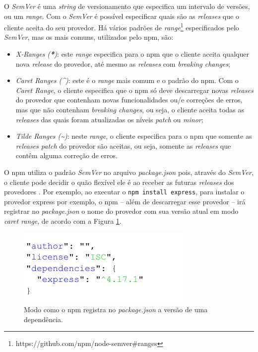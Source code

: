 O \textit{SemVer} é uma \textit{string} de versionamento que especifica um intervalo de versões, ou um \textit{range}. Com o \textit{SemVer} é possível especificar quais são as \textit{releases} que o cliente aceita do seu provedor. Há vários padrões de \textit{range}\footnote{https://github.com/npm/node-semver\#ranges} especificados pelo \textit{SemVer}, mas os mais comuns, utilizados pelo \textsf{npm}, são:

\begin{itemize}
    \item \textit{X-Ranges (\textbf{*})}: este \textit{range} especifica para o \textsf{npm} que o cliente aceita qualquer nova \textit{release} do provedor, até mesmo as \textit{releases} com \textit{breaking changes};
    \item \textit{Caret Ranges (\textbf{\textasciicircum})}: este é o \textit{range} mais comum e o padrão do \textsf{npm}. Com o \textit{Caret Range}, o cliente especifica que o \textsf{npm} só deve descarregar novas \textit{releases} do provedor que contenham novas funcionalidades ou/e correções de erros, mas que não contenham \textit{breaking changes}, ou seja, o cliente aceita todas as \textit{releases} das quais foram atualizadas os níveis \textit{patch} ou \textit{minor};
    \item \textit{Tilde Ranges (\textbf{\textasciitilde})}: neste \textit{range}, o cliente especifica para o \textsf{npm} que somente as \textit{releases patch} do provedor são aceitas, ou seja, somente as \textit{releases} que contêm alguma correção de erros.
\end{itemize}{}

O \textsf{npm} utiliza o padrão \textit{SemVer} no arquivo \textit{package.json} pois, através do \textit{SemVer}, o cliente pode decidir o quão flexível ele é ao receber as futuras \textit{releases} dos provedores \cite{decan}. Por exemplo, ao executar o \texttt{npm install express}, para instalar o provedor \textsf{express} por exemplo, o \textsf{npm} -- além de descarregar esse provedor -- irá registrar no \textit{package.json} o nome do provedor com sua versão atual em modo \textit{caret range}, de acordo com a Figura \ref{fig:dep_express}.

\begin{figure}
    \centering
    \includegraphics[scale=1.3]{figuras/dependencies_express.pdf}
    \caption{Modo como o \textsf{npm} registra no \textit{package.json} a versão de uma dependência.}
    \label{fig:dep_express}
\end{figure}{}

